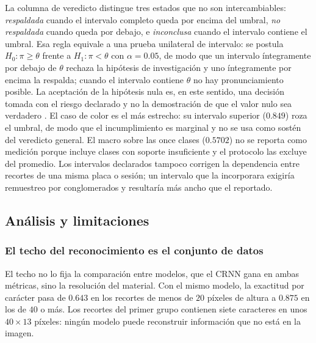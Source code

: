 La columna de veredicto distingue tres estados que no son intercambiables:
\emph{respaldada} cuando el intervalo completo queda por encima del umbral,
\emph{no respaldada} cuando queda por debajo, e \emph{inconclusa} cuando el
intervalo contiene el umbral.
Esa regla equivale a una prueba unilateral de intervalo: se postula
$H_0:\pi\ge\theta$ frente a $H_1:\pi<\theta$ con $\alpha=0{.}05$, de modo que un
intervalo íntegramente por debajo de $\theta$ rechaza la hipótesis de investigación
y uno íntegramente por encima la respalda; cuando el intervalo contiene $\theta$ no
hay pronunciamiento posible. La aceptación de la hipótesis nula es, en este
sentido, una decisión tomada con el riesgo declarado y no la demostración de que el
valor nulo sea verdadero \cite{neyman1933problem,fisher1935design,schuirmann1987comparison,lakens2017equivalence,lakens2018equivalence,kruschke2018rejecting}. El caso de color es el más
estrecho: su intervalo superior ($0{.}849$) roza el umbral, de modo que el
incumplimiento es marginal y no se usa como sostén del veredicto general. El macro
sobre las once clases ($0{.}5702$) no se reporta como medición porque incluye
clases con soporte insuficiente y el protocolo las excluye del promedio. Los
intervalos declarados tampoco corrigen la dependencia entre recortes de una misma
placa o sesión; un intervalo que la incorporara exigiría remuestreo por
conglomerados \cite{field2007bootstrapping} y resultaría más ancho que el
reportado.

\subsection{Análisis y limitaciones}

\subsubsection{El techo del reconocimiento es el conjunto de datos}

El techo no lo fija la comparación entre modelos, que el CRNN gana en ambas
métricas, sino la resolución del material. Con el mismo modelo, la exactitud por
carácter pasa de $0{.}643$ en los recortes de menos de $20$ píxeles de altura a
$0{.}875$ en los de $40$ o más. Los recortes del primer grupo contienen siete
caracteres en unos $40 \times 13$ píxeles: ningún modelo puede reconstruir
información que no está en la imagen.


